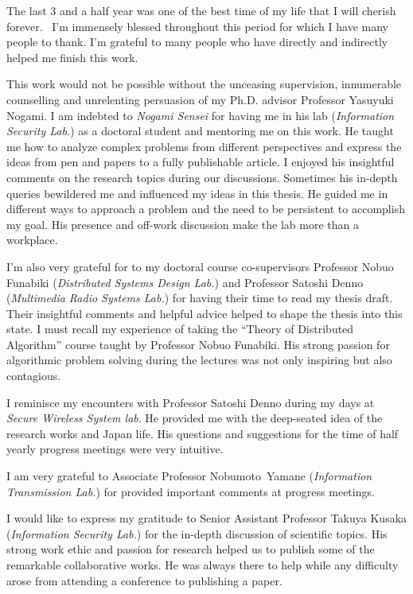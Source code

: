 The last 3 and a half year was one of the best time of my life that I will cherish forever. 
I'm immensely blessed throughout this period for which I have many people to thank.
I'm grateful to many people who have directly and indirectly helped me finish this work.

 
This work would not be possible without the unceasing supervision, innumerable counselling and unrelenting persuasion of my Ph.D. advisor Professor Yasuyuki Nogami.
I am indebted to \textit{Nogami Sensei} for having me in his lab (\textit{Information Security Lab.}) as a doctoral student and mentoring me on this work.
He taught me how to analyze complex problems from different perspectives and express the ideas from pen and papers to a fully publishable article.
I enjoyed his insightful comments on the research topics during our discussions.
Sometimes his in-depth queries bewildered me and influenced my ideas in this thesis.
He guided me in different ways to approach a problem and the need to be persistent to accomplish my goal.
His presence and off-work discussion make the lab more than a workplace. 

 
I’m also very grateful for to my doctoral course co-supervisors Professor Nobuo Funabiki (\textit{Distributed Systems Design Lab.}) and Professor Satoshi Denno (\textit{Multimedia Radio Systems Lab.}) for having their time to read my thesis draft.
Their insightful comments and helpful advice helped to shape the thesis into this state.
I must recall my experience of taking the “Theory of Distributed Algorithm” course taught by Professor Nobuo Funabiki.
His strong passion for algorithmic problem solving during the lectures was not only inspiring but also contagious. 

 
I reminisce my encounters with Professor Satoshi Denno during my days at \textit{Secure Wireless System lab}.
He provided me with the  deep-seated idea of the research works and Japan life.
His questions and suggestions for the time of half yearly progress meetings were very intuitive. 

 
I am very grateful to Associate Professor \mbox{Nobumoto Yamane} (\textit{Information Transmission Lab.}) for provided important comments at progress meetings.

 
I would like to express my gratitude to Senior Assistant Professor Takuya Kusaka (\textit{Information Security Lab.}) for the in-depth discussion of scientific topics.
His strong work ethic and passion for research helped us to publish some of the remarkable collaborative works. 
He was always there to help while any difficulty arose from attending a conference to publishing a paper.  

